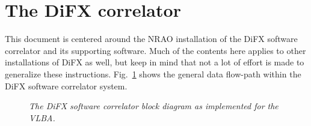 \section{The DiFX correlator}

This document is centered around the NRAO installation of the DiFX \cite{difx} software correlator and its supporting software.
Much of the contents here applies to other installations of DiFX as well, but keep in mind that not a lot of effort is made to generalize these instructions.
Fig.~\ref{fig:block} shows the general data flow-path within the DiFX software correlator system.

\begin{figure}[h]
\begin{center}
\caption[blockdiagram]{
{\em The DiFX software correlator block diagram as implemented for the VLBA.}
\label{fig:block}
}
\end{center}
\end{figure}

